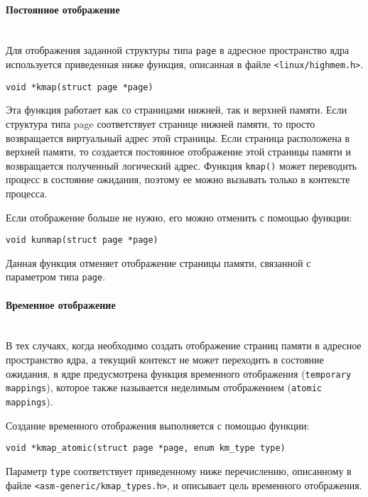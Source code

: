 \documentclass[12pt]{article}
\begin{document}
\paragraph*{Постоянное отображение}
~\\

Для отображения заданной структуры типа \verb!page! в адресное пространство ядра используется приведенная ниже функция, описанная в файле \verb!<linux/highmem.h>!.

\begin{lstlisting}
void *kmap(struct page *page)
\end{lstlisting}

Эта функция работает как со страницами нижней, так и верхней памяти. Если структура типа page соответствует странице нижней памяти, то просто возвращается виртуальный адрес этой страницы. Если страница расположена в верхней памяти, то создается
постоянное отображение этой страницы памяти и возвращается полученный логический адрес. Функция \verb!kmap()! может переводить процесс в состояние ожидания, поэтому ее
можно вызывать только в контексте процесса.

Если отображение больше не нужно, его можно отменить с помощью функции:

\begin{lstlisting}
void kunmap(struct page *page)
\end{lstlisting}

Данная функция отменяет отображение страницы памяти, связанной с параметром
типа \verb!page!.

\paragraph*{Временное отображение}
~\\

В тех случаях, когда необходимо создать отображение страниц памяти в адресное
пространство ядра, а текущий контекст не может переходить в состояние ожидания, в ядре
предусмотрена функция временного отображения (\verb!temporary mappings!), которое также
называется неделимым отображением (\verb!atomic mappings!).

Создание временного отображения выполняется с помощью функции:

\begin{lstlisting}
void *kmap_atomic(struct page *page, enum km_type type)
\end{lstlisting}

Параметр \verb!type! соответствует приведенному ниже перечислению,
описанному в файле \verb!<asm-generic/kmap_types.h>!, и описывает цель временного отображения.
\end{document}

